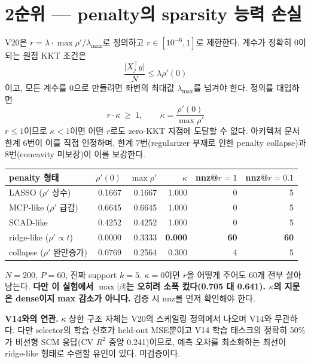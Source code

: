 \documentclass[11pt,a4paper]{article}
\theoremstyle{definition}
\begin{document}
\section{2순위 --- penalty의 sparsity 능력 손실}

V20은 \(r=\lambda\cdot\max\rho'/\lambda_{\max}\)로 정의하고 \(r\in[10^{-6},1]\)로 제한한다. 계수가 정확히 0이 되는 원점 KKT 조건은
\[
\frac{\lvert X_j^\top y\rvert}{N}\le\lambda\rho'(0)
\]
이고, 모든 계수를 0으로 만들려면 좌변의 최대값 \(\lambda_{\max}\)를 넘겨야 한다. 정의를 대입하면
\[
\boxed{\ r\cdot\kappa\ \ge\ 1,\qquad \kappa=\frac{\rho'(0)}{\max\rho'}\ }
\]
\(r\le1\)이므로 \(\kappa<1\)이면 어떤 \(r\)로도 zero-KKT 지점에 도달할 수 없다. 아키텍처 문서 한계 6번이 이를 직접 인정하며, 한계 7번(regularizer 부재로 인한 penalty collapse)과 8번(concavity 미보장)이 이를 보강한다.

\begin{center}
\small
\begin{tabular}{@{}lrrrrr@{}}
\toprule
\textbf{penalty 형태} & \(\rho'(0)\) & \(\max\rho'\) & \(\kappa\) & nnz@\(r{=}1\) & nnz@\(r{=}0.1\)\\
\midrule
LASSO (\(\rho'\) 상수) & 0.1667 & 0.1667 & 1.000 & 0 & 5\\
MCP-like (\(\rho'\) 급감) & 0.6645 & 0.6645 & 1.000 & 0 & 5\\
SCAD-like & 0.4252 & 0.4252 & 1.000 & 0 & 5\\
ridge-like (\(\rho'\propto t\)) & 0.0000 & 0.3333 & \textbf{0.000} & \textbf{60} & \textbf{60}\\
collapse (\(\rho'\) 완만증가) & 0.0769 & 0.2564 & 0.300 & 4 & 5\\
\bottomrule
\end{tabular}
\end{center}

\(N=200\), \(P=60\), 진짜 support \(k=5\). \(\kappa=0\)이면 \(r\)을 어떻게 주어도 60개 전부 살아남는다. \textbf{다만 이 실험에서 \(\max\lvert\beta\rvert\)는 오히려 소폭 컸다(0.705 대 0.641). \(\kappa\)의 지문은 dense이지 max 감소가 아니다.} 검증 시 nnz를 먼저 확인해야 한다.

\textbf{V14와의 연관.} \(\kappa\) 상한 구조 자체는 V20의 스케일링 정의에서 나오며 V14와 무관하다. 다만 selector의 학습 신호가 held-out MSE뿐이고 V14 학습 태스크의 정확히 50\%가 비선형 SCM 응답(CV \(R^2\) 중앙 0.241)이므로, 예측 오차를 최소화하는 최선이 ridge-like 형태로 수렴할 유인이 있다. 미검증이다.

\end{document}

